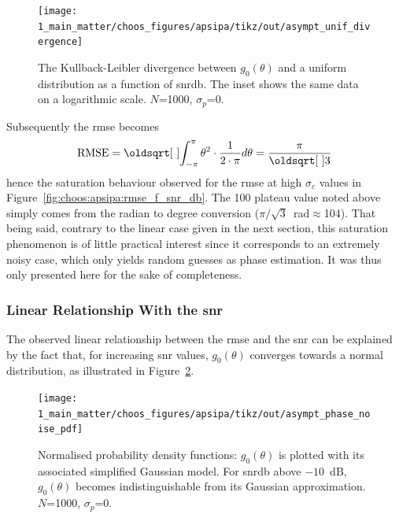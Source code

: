\begin{figure}
	\centering
	\texttt{[image: 1\_main\_matter/choos\_figures/apsipa/tikz/out/asympt\_unif\_divergence]}
	\caption[The Kullback-Leibler divergence between $g_0(\theta)$ and a uniform distribution as a function of \gls{snrdb}.]{The Kullback-Leibler divergence between $g_0(\theta)$ and a uniform distribution as a function of \gls{snrdb}. The inset shows the same data on a logarithmic scale. $N$=1000, $\sigma_p$=0.}
	\label{fig:choos:apsipa:bhata_dist_uniform}
\end{figure}

Subsequently the \gls{rmse} becomes
\begin{equation}
	\text{RMSE} = \sqrt{\int_{-\pi}^{\pi} \theta^2 \cdot 	\frac{1}{2 \cdot \pi} d\theta}\\
	= \frac{\pi}{\sqrt{3}}
\end{equation}
hence the saturation behaviour observed for the \gls{rmse} at high $\sigma_c$ values in Figure~\ref{fig:choos:apsipa:rmse_f_snr_db}. The 100{\degree} plateau value noted above simply comes from the radian to degree conversion ($\pi/\sqrt{3}$~rad$\approx$104{\degree}). That being said, contrary to the linear case given in the next section, this saturation phenomenon is of little practical interest since it corresponds to an extremely noisy case, which only yields random guesses as phase estimation. It was thus only presented here for the sake of completeness.

\subsubsection{Linear Relationship With the \texorpdfstring{\gls{snr}}{SNR}}\label{subseq:choos:apsipa:linear_rel}

The observed linear relationship between the \gls{rmse} and the \gls{snr} can be explained by the fact that, for increasing \gls{snr} values, $g_0(\theta)$ converges towards a normal distribution, as illustrated in Figure~\ref{fig:choos:apsipa:asympt_linear_pdf}.

\begin{figure}
	\centering
	\texttt{[image: 1\_main\_matter/choos\_figures/apsipa/tikz/out/asympt\_phase\_noise\_pdf]}
	\caption[$g_0(\theta)$ and its associated simplified Gaussian model.]{Normalised probability density functions: $g_0(\theta)$ is plotted with its associated simplified Gaussian model. For \gls{snrdb} above $-10$~dB, $g_0(\theta)$ becomes indistinguishable from its Gaussian approximation. $N$=1000, $\sigma_p$=0.}
	\label{fig:choos:apsipa:asympt_linear_pdf}
\end{figure}

